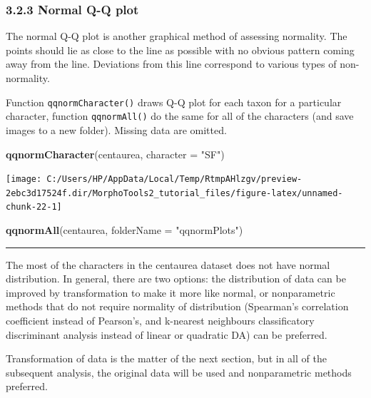 \documentclass[
]{article}
\newenvironment{Shaded}{\begin{snugshade}}{\end{snugshade}}
\newcommand{\DataTypeTok}[1]{\textcolor[rgb]{0.13,0.29,0.53}{#1}}
\newcommand{\KeywordTok}[1]{\textcolor[rgb]{0.13,0.29,0.53}{\textbf{#1}}}
\newcommand{\NormalTok}[1]{#1}
\newcommand{\StringTok}[1]{\textcolor[rgb]{0.31,0.60,0.02}{#1}}
\begin{document}
\hypertarget{normal-q-q-plot}{%
\subsubsection{3.2.3 Normal Q-Q plot}\label{normal-q-q-plot}}

The normal Q-Q plot is another graphical method of assessing normality.
The points should lie as close to the line as possible with no obvious
pattern coming away from the line. Deviations from this line correspond
to various types of non-normality.

Function \texttt{qqnormCharacter()} draws Q-Q plot for each taxon for a
particular character, function \texttt{qqnormAll()} do the same for all
of the characters (and save images to a new folder). Missing data are
omitted.

\begin{Shaded}
\begin{Highlighting}[]
\KeywordTok{qqnormCharacter}\NormalTok{(centaurea, }\DataTypeTok{character =} \StringTok{"SF"}\NormalTok{)}
\end{Highlighting}
\end{Shaded}

\begin{center}\texttt{[image: C:/Users/HP/AppData/Local/Temp/RtmpAHlzgv/preview-2ebc3d17524f.dir/MorphoTools2\_tutorial\_files/figure-latex/unnamed-chunk-22-1]} \end{center}

\begin{Shaded}
\begin{Highlighting}[]
\KeywordTok{qqnormAll}\NormalTok{(centaurea, }\DataTypeTok{folderName =} \StringTok{"qqnormPlots"}\NormalTok{)}
\end{Highlighting}
\end{Shaded}

\begin{center}\rule{0.5\linewidth}{\linethickness}\end{center}

The most of the characters in the centaurea dataset does not have normal
distribution. In general, there are two options: the distribution of
data can be improved by transformation to make it more like normal, or
nonparametric methods that do not require normality of distribution
(Spearman's correlation coefficient instead of Pearson's, and k-nearest
neighbours classificatory discriminant analysis instead of linear or
quadratic DA) can be preferred.

Transformation of data is the matter of the next section, but in all of
the subsequent analysis, the original data will be used and
nonparametric methods preferred.
\end{document}
